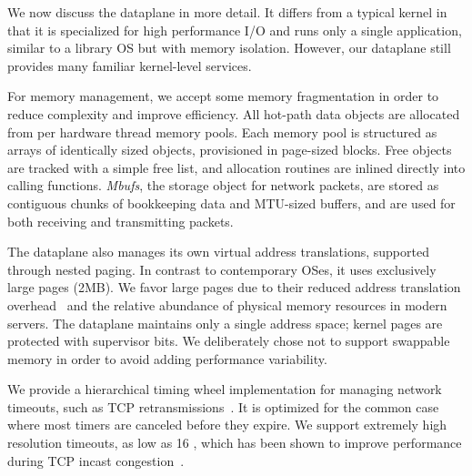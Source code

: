 We now discuss the \ix dataplane in more detail. It differs from a typical
kernel in that it is specialized for high performance I/O and runs only a single
application, similar to a library OS but with memory
isolation. However, our dataplane still provides many
familiar kernel-level services.

For memory management, we accept some memory fragmentation in order to
reduce complexity and improve efficiency. All hot-path data objects
are allocated from per hardware thread memory pools. Each memory pool
is structured as arrays of identically sized objects, provisioned in
page-sized blocks. Free objects are tracked with a simple free list,
and allocation routines are inlined directly into calling
functions. \emph{Mbufs}, the storage object for network packets, are stored
as contiguous chunks of bookkeeping data and MTU-sized buffers, and
are used for both receiving and transmitting packets.

The dataplane also manages its own virtual address translations,
supported through nested paging. In contrast to contemporary OSes, it
uses exclusively large pages (2MB). We favor large pages due to
their reduced address translation
overhead~\cite{DBLP:conf/isca/BasuGCHS13, dune} and the relative
abundance of physical memory resources in modern servers. The
dataplane maintains only a single address space; kernel pages are
protected with supervisor bits. We deliberately chose not to support
swappable memory in order to avoid adding performance variability.

We provide a hierarchical timing wheel implementation for managing
network timeouts, such as TCP
retransmissions~\cite{DBLP:conf/sosp/VargheseL87}. It is optimized for
the common case where most timers are canceled before they expire. We
support extremely high resolution timeouts, as low as 16 \microsecond,
which has been shown to improve performance during TCP incast
congestion~\cite{DBLP:conf/sigcomm/VasudevanPSKAGGM09}.

